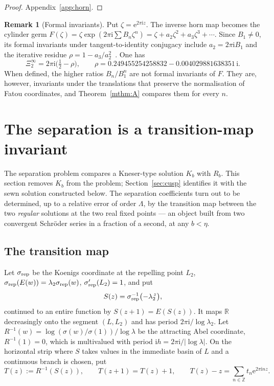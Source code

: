 \documentclass[11pt]{amsart}
\theoremstyle{definition}
\newtheorem{remark}[theorem]{Remark}
\newcommand{\Rr}{R}
\newcommand{\Kk}{K}
\newcommand{\eee}{\mathrm{e}}
\newcommand{\ii}{\mathrm{i}}
\begin{document}
\begin{proof}
Appendix~\ref{app:horn}.
\end{proof}

\begin{remark}[Formal invariants]\label{rem:formal}
Put $\zeta=\eee^{2\pi\ii z}$.  The inverse horn map becomes the cylinder germ
$F(\zeta)=\zeta\exp(2\pi\ii\sum B_n\zeta^n)=\zeta+a_2\zeta^2+a_3\zeta^3+\cdots$.
Since $B_1\ne0$, its formal invariants under tangent-to-identity conjugacy
include $a_2=2\pi\ii B_1$ and the iterative residue
$\rho=1-a_3/a_2^2$~\cite{BuffEpstein2002}.  One has
\begin{equation}\label{eq:kapparho}
 \Xi_2^\infty=2\pi\ii\bigl(\tfrac12-\rho\bigr),\qquad
 \rho=0.249455254258832-0.004029881638351\,\ii .
\end{equation}
When defined, the higher ratios $B_n/B_1^n$ are not formal invariants of $F$.  They are,
however, invariants under the translations that preserve the normalisation of
Fatou coordinates, and Theorem~\ref{mthm:A} compares them for every $n$.
\end{remark}

\section{The separation is a transition-map invariant}\label{sec:transition}

The separation problem compares a Kneser-type solution $\Kk_b$ with $\Rr_b$.
This section removes $\Kk_b$ from the problem; Section~\ref{sec:cusp}
identifies it with the sewn solution constructed below.  The separation coefficients turn out to be determined, up to a
relative error of order $\Lambda$, by the transition map between the two
\emph{regular} solutions at the two real fixed points --- an object built from
two convergent Schr\"oder series in a fraction of a second, at any $b<\eta$.

\subsection{The transition map}
Let $\sigma_{\rm rep}$ be the Koenigs coordinate at the repelling point $L_2$,
$\sigma_{\rm rep}(E(w))=\lambda_2\sigma_{\rm rep}(w)$, $\sigma_{\rm rep}'(L_2)=1$, and put
\[
 S(z)=\sigma_{\rm rep}^{-1}\bigl(-\lambda_2^{\,z}\bigr),
\]
continued to an entire function by $S(z+1)=E(S(z))$.  It maps $\mathbb R$
decreasingly onto the segment $(L,L_2)$ and has period $2\pi\ii/\log\lambda_2$.
Let $\Rr^{-1}(w)=\log(\sigma(w)/\sigma(1))/\log\lambda$ be the attracting Abel
coordinate, $\Rr^{-1}(1)=0$, which is multivalued with period
$\ii h=2\pi\ii/|\log\lambda|$.  On the horizontal strip where $S$ takes values
in the immediate basin of $L$ and a continuous branch is chosen, put
\[
 T(z):=\Rr^{-1}(S(z)),\qquad T(z+1)=T(z)+1,\qquad
 T(z)-z=\sum_{n\in\mathbb Z}t_n\eee^{2\pi\ii nz}.
\]
\end{document}
